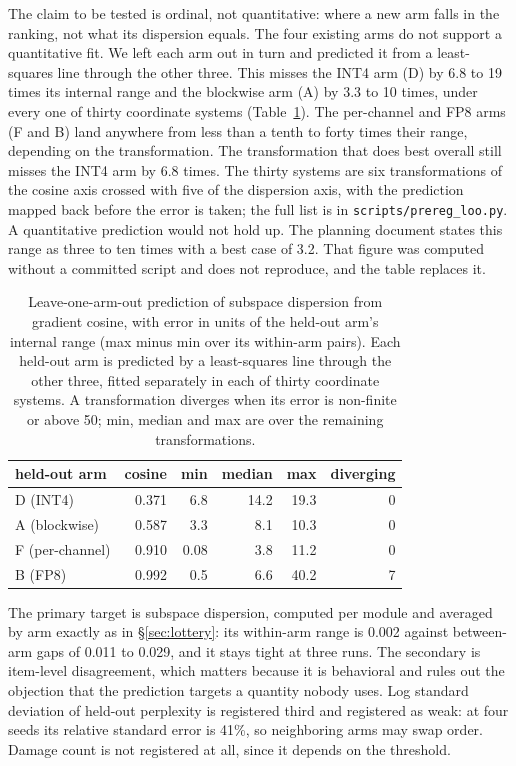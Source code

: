 \documentclass[11pt,letterpaper]{article}
\begin{document}
\medskip
The claim to be tested is ordinal, not quantitative: where a new arm falls in the ranking, not what its dispersion equals. The four existing arms do not support a quantitative fit. We left each arm out in turn and predicted it from a least-squares line through the other three. This misses the INT4 arm (D) by 6.8 to 19 times its internal range and the blockwise arm (A) by 3.3 to 10 times, under every one of thirty coordinate systems (Table~\ref{tab:prereg_loo}). The per-channel and FP8 arms (F and B) land anywhere from less than a tenth to forty times their range, depending on the transformation. The transformation that does best overall still misses the INT4 arm by 6.8 times. The thirty systems are six transformations of the cosine axis crossed with five of the dispersion axis, with the prediction mapped back before the error is taken; the full list is in \texttt{scripts/prereg\_loo.py}. A quantitative prediction would not hold up. The planning document states this range as three to ten times with a best case of 3.2. That figure was computed without a committed script and does not reproduce, and the table replaces it.

\begin{table}[htbp]
\centering
\small
\caption{Leave-one-arm-out prediction of subspace dispersion from gradient cosine, with error in units of the held-out arm's internal range (max minus min over its within-arm pairs). Each held-out arm is predicted by a least-squares line through the other three, fitted separately in each of thirty coordinate systems. A transformation diverges when its error is non-finite or above 50; min, median and max are over the remaining transformations.}
\label{tab:prereg_loo}
\begin{tabular}{lrrrrr}
\toprule
held-out arm & cosine & min & median & max & diverging \\
\midrule
D (INT4)        & 0.371 &  6.8 & 14.2 & 19.3 & 0 \\
A (blockwise)   & 0.587 &  3.3 &  8.1 & 10.3 & 0 \\
F (per-channel) & 0.910 & 0.08 &  3.8 & 11.2 & 0 \\
B (FP8)         & 0.992 &  0.5 &  6.6 & 40.2 & 7 \\
\bottomrule
\end{tabular}
\end{table}

The primary target is subspace dispersion, computed per module and averaged by arm exactly as in \S\ref{sec:lottery}: its within-arm range is 0.002 against between-arm gaps of 0.011 to 0.029, and it stays tight at three runs. The secondary is item-level disagreement, which matters because it is behavioral and rules out the objection that the prediction targets a quantity nobody uses. Log standard deviation of held-out perplexity is registered third and registered as weak: at four seeds its relative standard error is 41\%, so neighboring arms may swap order. Damage count is not registered at all, since it depends on the threshold.
\end{document}
